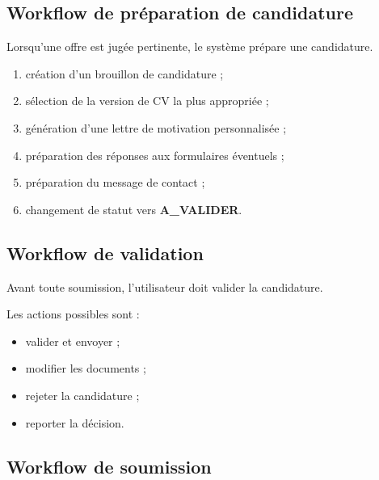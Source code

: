 \documentclass[11pt,a4paper]{article}
\begin{document}
\subsection{Workflow de préparation de candidature}

Lorsqu’une offre est jugée pertinente, le système prépare une candidature.

\begin{enumerate}

\item création d’un brouillon de candidature ;

\item sélection de la version de CV la plus appropriée ;

\item génération d’une lettre de motivation personnalisée ;

\item préparation des réponses aux formulaires éventuels ;

\item préparation du message de contact ;

\item changement de statut vers \textbf{A\_VALIDER}.

\end{enumerate}

\subsection{Workflow de validation}

Avant toute soumission, l’utilisateur doit valider la candidature.

Les actions possibles sont :

\begin{itemize}

\item valider et envoyer ;

\item modifier les documents ;

\item rejeter la candidature ;

\item reporter la décision.

\end{itemize}

\subsection{Workflow de soumission}
\end{document}
